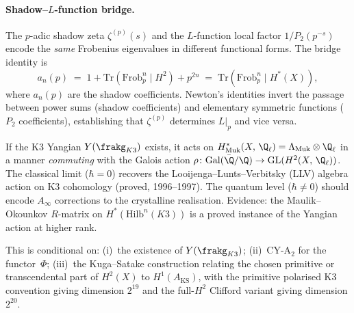 \paragraph{Shadow--\texorpdfstring{$L$}{L}-function bridge.}
The $p$-adic shadow zeta $\zeta^{(p)}(s)$ and the $L$-function local factor $1/P_2(p^{-s})$ encode the \emph{same} Frobenius eigenvalues in different functional forms. The bridge identity is
\begin{equation}\label{eq:shadow-l-bridge}
 a_n(p) \;=\; 1 + \mathrm{Tr}(\mathrm{Frob}_p^n \mid H^2) + p^{2n}
 \;=\; \mathrm{Tr}(\mathrm{Frob}_p^n \mid H^*(X)),
\end{equation}
where $a_n(p)$ are the shadow coefficients. Newton's identities invert the passage between power sums (shadow coefficients) and elementary symmetric functions ($P_2$ coefficients), establishing that $\zeta^{(p)}$ determines $L|_p$ and vice versa.

\begin{conjecture}
\label{conj:yangian-ladic-cohomology}
\ClaimStatusConjectured
If the K3 Yangian $Y(\frakg_{K3})$ exists, it acts on $H^*_{\mathrm{Muk}}(X,\, \Q_\ell) = \Lambda_{\mathrm{Muk}} \otimes \Q_\ell$ in a manner \emph{commuting} with the Galois action $\rho\colon \mathrm{Gal}(\bar{\Q}/\Q) \to \mathrm{GL}(H^2(X,\, \Q_\ell))$. The classical limit ($\hbar = 0$) recovers the Looijenga--Lunts--Verbitsky (LLV) algebra action on K3 cohomology (proved, 1996--1997). The quantum level ($\hbar \neq 0$) should encode $A_\infty$ corrections to the crystalline realisation. Evidence: the Maulik--Okounkov $R$-matrix on $H^*(\mathrm{Hilb}^n(K3))$ is a proved instance of the Yangian action at higher rank.

This is conditional on: (i)~the existence of $Y(\frakg_{K3})$; (ii)~CY-A$_2$ for the functor~$\Phi$; (iii)~the Kuga--Satake construction relating the chosen primitive or transcendental part of $H^2(X)$ to $H^1(A_{\mathrm{KS}})$, with the primitive polarised K3 convention giving dimension $2^{19}$ and the full-$H^2$ Clifford variant giving dimension $2^{20}$.
\end{conjecture}

